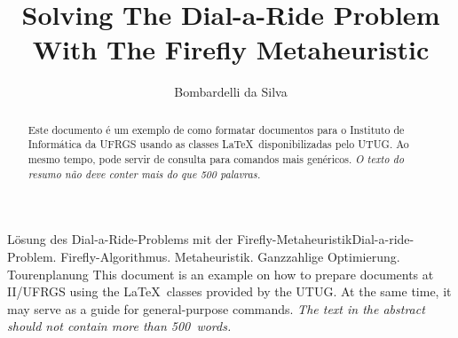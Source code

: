 \documentclass[tuberlin,cic,tc,openright,english,noabntcite,oneside]{iiufrgs}
\title{Solving The Dial-a-Ride Problem With The Firefly Metaheuristic}
\author{Bombardelli da Silva}{Fernando}
\begin{document}
\maketitle





\begin{abstract}
    Este documento é um exemplo de como formatar documentos para o
    Instituto de Informática da UFRGS usando as classes \LaTeX\
    disponibilizadas pelo UTUG\@. Ao mesmo tempo, pode servir de consulta
    para comandos mais genéricos. \emph{O texto do resumo não deve
      conter mais do que 500 palavras.}
\end{abstract}

\begin{englishabstract}{Lösung des Dial-a-Ride-Problems mit der Firefly-Metaheuristik}{Dial-a-ride-Problem. Firefly-Algorithmus. Metaheuristik. Ganzzahlige Optimierung. Tourenplanung}
    This document is an example on how to prepare documents at II/UFRGS
    using the \LaTeX\ classes provided by the UTUG\@. At the same time, it
    may serve as a guide for general-purpose commands. \emph{The text in
      the abstract should not contain more than 500~words.}
\end{englishabstract}

\listoffigures

\listoftables
\end{document}
